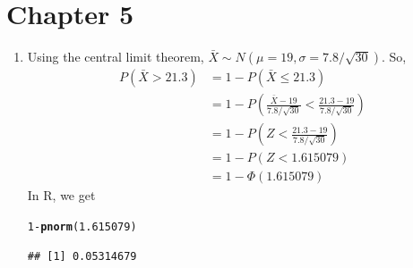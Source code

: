 \documentclass{article}\usepackage[]{graphicx}\usepackage[]{color}
\makeatletter
\newcommand{\hlnum}[1]{\textcolor[rgb]{0.686,0.059,0.569}{#1}}%
\newcommand{\hlopt}[1]{\textcolor[rgb]{0,0,0}{#1}}%
\newcommand{\hlstd}[1]{\textcolor[rgb]{0.345,0.345,0.345}{#1}}%
\newcommand{\hlkwd}[1]{\textcolor[rgb]{0.737,0.353,0.396}{\textbf{#1}}}%
\newenvironment{kframe}{%
 \def\at@end@of@kframe{}%
 \ifinner\ifhmode%
  \def\at@end@of@kframe{\end{minipage}}%
  \begin{minipage}{\columnwidth}%
 \fi\fi%
 \def\FrameCommand##1{\hskip\@totalleftmargin \hskip-\fboxsep
 \colorbox{shadecolor}{##1}\hskip-\fboxsep
     \hskip-\linewidth \hskip-\@totalleftmargin \hskip\columnwidth}%
 \MakeFramed {\advance\hsize-\width
   \@totalleftmargin\z@ \linewidth\hsize
   \@setminipage}}%
 {\par\unskip\endMakeFramed%
 \at@end@of@kframe}
\newenvironment{knitrout}{}{} %
\makeatother
\begin{document}
\section{Chapter 5}

\begin{enumerate}

  \item Using the central limit theorem, $\bar{X} \sim N\left(\mu = 19, \sigma = 7.8 / \sqrt{30}\right)$. So, 
      \begin{align*}
        P\left(\bar{X} > 21.3\right) &= 1 - P\left(\bar{X} \le 21.3\right) \\
          &= 1 - P\left(\frac{\bar{X} - 19}{7.8 / \sqrt{30}} < \frac{21.3 - 19}{7.8 / \sqrt{30}}\right) \\
          &= 1 - P\left(Z < \frac{21.3 - 19}{7.8 / \sqrt{30}}\right) \\
          &= 1 - P\left(Z < 1.615079\right) \\
          &= 1 - \Phi\left(1.615079\right)
      \end{align*}
      In R, we get
\begin{knitrout}
\color{fgcolor}\begin{kframe}
\begin{alltt}
\hlnum{1} \hlopt{-} \hlkwd{pnorm}\hlstd{(}\hlnum{1.615079}\hlstd{)}
\end{alltt}
\begin{verbatim}
## [1] 0.05314679
\end{verbatim}
\end{kframe}
\end{knitrout}
      

\end{enumerate}
\end{document}
